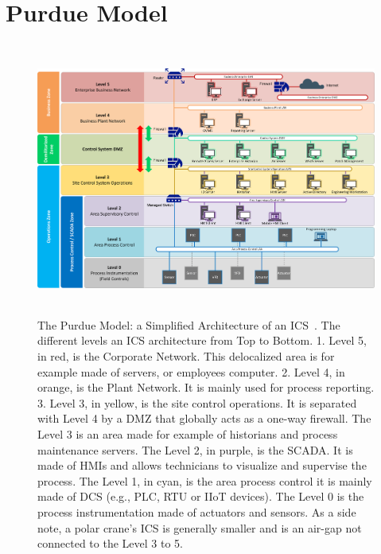 \chapter{Purdue Model}
\begin{figure}[H]
    \centering
    \vspace{-0.75cm}
    \includegraphics[height=9cm]{figures/ICS-Purdue-Model.pdf}
    \caption{The Purdue Model: a Simplified Architecture of an ICS~\cite{imgPurdueModel}. The different levels an ICS architecture from Top to Bottom. 1. Level 5, in red, is the Corporate Network. This delocalized area is for example made of servers, or employees computer. 2. Level 4, in orange, is the Plant Network. It is mainly used for process reporting. 3. Level 3, in yellow, is the site control operations. It is separated with Level 4 by a DMZ that globally acts as a one-way firewall. The Level 3 is an area made for example of historians and process maintenance servers. The Level 2, in purple, is the SCADA. It is made of HMIs and allows technicians to visualize and supervise the process. The Level 1, in cyan, is the area process control it is mainly made of DCS (e.g., PLC, RTU or IIoT devices). The Level 0 is the process instrumentation made of actuators and sensors. As a side note, a polar crane's ICS is generally smaller and is an air-gap not connected to the Level 3 to 5.}
    \label{fig:purdue-model}
\end{figure}

